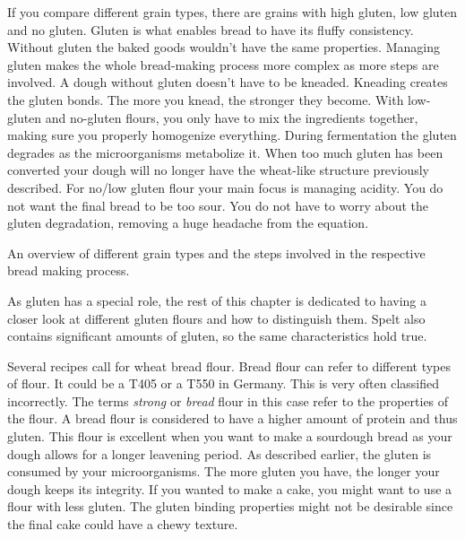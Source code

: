 If you compare different grain types, there are grains with high gluten, low gluten
and no gluten. Gluten is what enables bread to have its fluffy consistency.
Without gluten the baked goods wouldn't have the same properties. Managing
gluten makes the whole bread-making process more complex as more steps are involved.
A dough without gluten doesn't have to be kneaded. Kneading creates
the gluten bonds. The more you knead, the stronger they become. With low-gluten
and no-gluten flours, you only have to mix the ingredients together, making
sure you properly homogenize everything. During fermentation
the gluten degrades as the microorganisms metabolize it. When too much gluten
has been converted your dough will no longer have the wheat-like structure previously
described. For no/low gluten flour your main focus is managing acidity. You do not
want the final bread to be too sour. You do not have to worry about the gluten
degradation, removing a huge headache from the equation.

\begin{table}[!htb]
    \begin{center}
        
        \caption[Different types of grain]{An overview of different grain
          types and the steps involved in the respective bread making process.}
    \end{center}
\end{table}

As gluten has a special role, the rest of this chapter is dedicated to having a
closer look at different gluten flours and how to distinguish them. Spelt
also contains significant amounts of gluten, so the same characteristics hold
true.

Several recipes call for wheat bread flour. Bread flour can refer to different types
of flour. It could be a T405 or a T550 in Germany. This is very often
classified incorrectly. The terms \emph{strong} or \emph{bread} flour in this case
refer to the properties of the flour. A bread flour is considered to have a
higher amount of protein and thus gluten. This flour is excellent when you
want to make a sourdough bread as your dough allows for a longer leavening
period. As described earlier, the gluten is consumed by your microorganisms.
The more gluten you have, the longer your dough keeps its integrity. If you wanted
to make a cake, you might want to use a flour with less gluten. The gluten binding
properties might not be desirable since the final cake could have a chewy texture.

